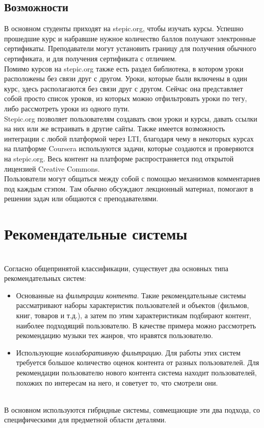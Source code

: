 \documentclass[14pt]{matmex-diploma}
\begin{document}
\subsection{Возможности}
\indent В основном студенты приходят на stepic.org, чтобы изучать курсы. Успешно прошедшие курс и набравшие нужное количество баллов получают электронные сертификаты. Преподаватели могут установить границу для получения обычного сертификата, и для получения сертификата с отличием.
\\\indent Помимо курсов на stepic.org также есть раздел библиотека, в котором уроки расположены без связи друг с другом. Уроки, которые были включены в один курс, здесь располагаются без связи друг с другом. Сейчас она представляет собой просто список уроков, из которых можно отфильтровать уроки по тегу, либо рассмотреть уроки из одного пути.
\\\indent Stepic.org позволяет пользователям создавать свои уроки и курсы, давать ссылки на них или же встраивать в другие сайты. Также имеется возможность интеграции с любой платформой через LTI, благодаря чему в некоторых курсах на платформе Coursera\cite{coursera} используются задачи, которые создаются и проверяются на stepic.org. Весь контент на платформе распространяется под открытой лицензией Creative Commons\cite{creativecommons}.
\\\indent Пользователи могут общаться между собой с помощью механизмов комментариев под каждым стэпом. Там обычно обсуждают лекционный материал, помогают в решении задач или общаются с преподавателями.


\section{Рекомендательные системы}
\\\indent Согласно общепринятой классификации\cite{rec_sys_handbook}, существует два основных типа рекомендательных систем:
\begin{itemize}
    \item Основанные на \textit{фильтрации контента}. Такие рекомендательные системы рассматривают наборы характеристик пользователей и объектов (фильмов, книг, товаров и т.д.), а затем по этим характеристикам подбирают контент, наиболее подходящий пользователю. В качестве примера можно рассмотреть рекомендацию музыки тех жанров, что нравятся пользователю.
    \item Использующие \textit{коллаборативную фильтрацию}. Для работы этих систем требуется большое количество оценок контента от разных пользователей. Для рекомендации пользователю нового контента система находит пользователей, похожих по интересам на него, и советует то, что смотрели они.
\end{itemize}
\\\indent В основном используются гибридные системы, совмещающие эти два подхода, со специфическими для предметной области деталями. 
\end{document}
